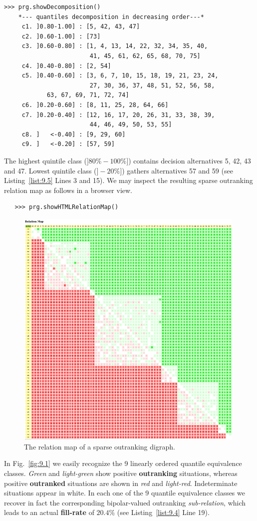 \begin{lstlisting}[caption={The quantiles decomposition of a pre-ranked outranking digraph},label=list:9.5]
>>> prg.showDecomposition()
    *--- quantiles decomposition in decreasing order---*
     c1. ]0.80-1.00] : [5, 42, 43, 47]
     c2. ]0.60-1.00] : [73]
     c3. ]0.60-0.80] : [1, 4, 13, 14, 22, 32, 34, 35, 40,
                        41, 45, 61, 62, 65, 68, 70, 75]
     c4. ]0.40-0.80] : [2, 54]
     c5. ]0.40-0.60] : [3, 6, 7, 10, 15, 18, 19, 21, 23, 24,
                        27, 30, 36, 37, 48, 51, 52, 56, 58,
			63, 67, 69, 71, 72, 74]
     c6. ]0.20-0.60] : [8, 11, 25, 28, 64, 66]
     c7. ]0.20-0.40] : [12, 16, 17, 20, 26, 31, 33, 38, 39,
                        44, 46, 49, 50, 53, 55]
     c8. ]   <-0.40] : [9, 29, 60]
     c9. ]   <-0.20] : [57, 59]
\end{lstlisting}

The highest quintile class ($]80\%-100\%]$) contains decision alternatives 5, 42, 43 and 47. Lowest quintile class ($]-20\%]$) gathers alternatives 57 and 59 (see Listing~\vref{list:9.5} Lines 3 and 15). We may inspect the resulting sparse outranking relation map as follows in a browser view.
\begin{lstlisting}
   >>> prg.showHTMLRelationMap()
\end{lstlisting}
\begin{figure}[h]
\includegraphics[width=11cm]{Figures/9-1-sparse75RelationMap.png}
\caption{The relation map of a sparse outranking digraph.}
\label{fig:9.1}       %
\end{figure}
In Fig.~\vref{fig:9.1} we easily recognize the 9 linearly ordered quantile equivalence classes. \emph{Green} and \emph{light-green} show positive \textbf{outranking} situations, whereas positive \textbf{outranked} situations are shown in \emph{red} and \emph{light-red}. Indeterminate situations appear in white. In each one of the 9 quantile equivalence classes we recover in fact the corresponding bipolar-valued outranking \emph{sub-relation}, which leads to an actual \textbf{fill-rate} of $20.4\%$ (see Listing~\vref{list:9.4} Line 19).

